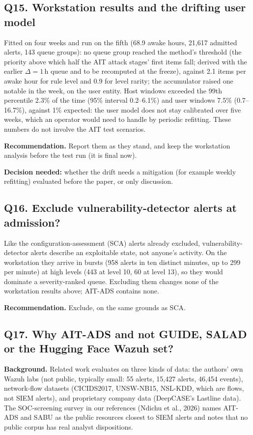 \documentclass[10.5pt,a4paper]{article}
\newcommand{\rec}[1]{\par\smallskip\noindent\colorbox{gray!12}{\parbox{\dimexpr\linewidth-2\fboxsep}{\textbf{Recommendation.} #1}}\par\smallskip}
\newcommand{\ask}[1]{\par\noindent\textbf{Decision needed:} #1\par\medskip}
\newcommand{\sub}[1]{\par\smallskip\noindent\textbf{#1}\quad}
\begin{document}
\subsection*{Q15. Workstation results and the drifting user model}
Fitted on four weeks and run on the fifth (68.9 awake hours, 21{,}617 admitted alerts, 143 queue groups): no queue group reached the method's threshold (the priority above which half the AIT attack stages' first items fall; derived with the earlier $\Delta = 1$\,h queue and to be recomputed at the freeze), against 2.1 items per awake hour for rule level and 0.9 for level rarity; the accumulator raised one notable in the week, on the user entity. Host windows exceeded the 99th percentile 2.3\% of the time (95\% interval 0.2--6.1\%) and user windows 7.5\% (0.7--16.7\%), against 1\% expected: the user model does not stay calibrated over five weeks, which an operator would need to handle by periodic refitting. These numbers do not involve the AIT test scenarios.
\rec{Report them as they stand, and keep the workstation analysis before the test run (it is final now).}
\ask{whether the drift needs a mitigation (for example weekly refitting) evaluated before the paper, or only discussion.}

\subsection*{Q16. Exclude vulnerability-detector alerts at admission?}
Like the configuration-assessment (SCA) alerts already excluded, vulnerability-detector alerts describe an exploitable state, not anyone's activity. On the workstation they arrive in bursts (958 alerts in ten distinct minutes, up to 299 per minute) at high levels (443 at level 10, 60 at level 13), so they would dominate a severity-ranked queue. Excluding them changes none of the workstation results above; AIT-ADS contains none.
\rec{Exclude, on the same grounds as SCA.}


\subsection*{Q17. Why AIT-ADS and not GUIDE, SALAD or the Hugging Face Wazuh set?}

\sub{Background.} Related work evaluates on three kinds of data: the authors' own Wazuh labs (not public, typically small: 55 alerts, 15{,}427 alerts, 46{,}454 events), network-flow datasets (CICIDS2017, UNSW-NB15, NSL-KDD, which are flows, not SIEM alerts), and proprietary company data (DeepCASE's Lastline data). The SOC-screening survey in our references (Ndichu et al., 2026) names AIT-ADS and SABU as the public resources closest to SIEM alerts and notes that no public corpus has real analyst dispositions.
\end{document}
